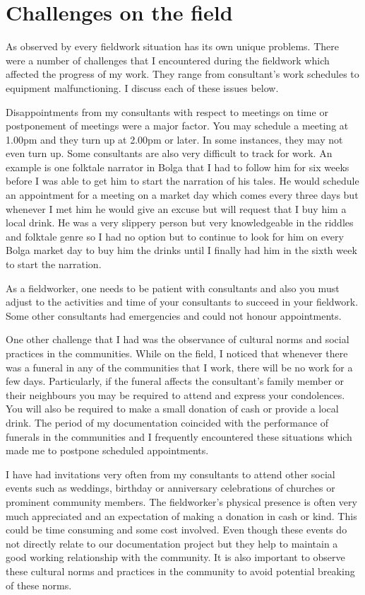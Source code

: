 \documentclass[output=paper,colorlinks,citecolor=brown]{langscibook}
\begin{document}
\section{Challenges on the field}

As observed by \cite{Bowern2015} every fieldwork situation has its own unique problems. There were a number of challenges that I encountered during the fieldwork which affected the progress of my work. They range from consultant’s work schedules to equipment malfunctioning. I discuss each of these issues below.

Disappointments from my consultants with respect to meetings on time or postponement of meetings were a major factor. You may schedule a meeting at 1.00pm and they turn up at 2.00pm or later. In some instances, they may not even turn up. Some consultants are also very difficult to track for work. An example is one folktale narrator in Bolga that I had to follow him for six weeks before I was able to get him to start the narration of his tales. He would schedule an appointment for a meeting on a market day which comes every three days but whenever I met him he would give an excuse but will request that I buy him a local drink. He was a very slippery person but very knowledgeable in the riddles and folktale genre so I had no option but to continue to look for him on every Bolga market day to buy him the drinks until I finally had him in the sixth week to start the narration. 

As a fieldworker, one needs to be patient with consultants and also you must adjust to the activities and time of your consultants to succeed in your fieldwork. Some other consultants had emergencies and could not honour appointments.

One other challenge that I had was the observance of cultural norms and social practices in the communities. While on the field, I noticed that whenever there was a funeral in any of the communities that I work, there will be no work for a few days. Particularly, if the funeral affects the consultant’s family member or their neighbours you may be required to attend and express your condolences. You will also be required to make a small donation of cash or provide a local drink. The period of my documentation coincided with the performance of funerals in the communities and I frequently encountered these situations which made me to postpone scheduled appointments. 

I have had invitations very often from my consultants to attend other social events such as weddings, birthday or anniversary celebrations of churches or prominent community members. The fieldworker’s physical presence is often very much appreciated and an expectation of making a donation in cash or kind. This could be time consuming and some cost involved. Even though these events do not directly relate to our documentation project but they help to maintain a good working relationship with the community. It is also important to observe these cultural norms and practices in the community to avoid potential breaking of these norms.  
\end{document}
